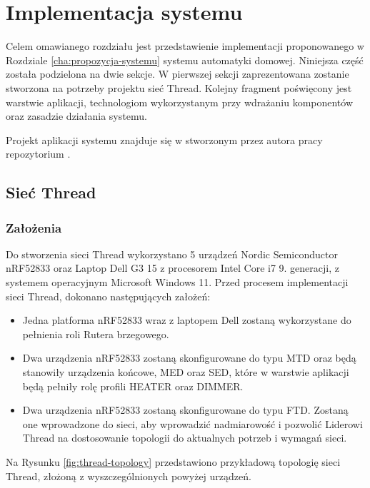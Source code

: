 \chapter{Implementacja systemu}
\label{cha:implementacja}

Celem omawianego rozdziału jest przedstawienie implementacji proponowanego w Rozdziale \ref{cha:propozycja-systemu} systemu automatyki domowej. Niniejsza część została podzielona na dwie sekcje. W pierwszej sekcji zaprezentowana zostanie stworzona na potrzeby projektu sieć Thread. Kolejny fragment poświęcony jest warstwie aplikacji, technologiom wykorzystanym przy wdrażaniu komponentów oraz zasadzie działania systemu.

Projekt aplikacji systemu znajduje się w stworzonym przez autora pracy repozytorium \cite{project-repo}.

\section{Sieć Thread}

    \subsection{Założenia}
    \label{sec:thread-network-assumptions}
    
        Do stworzenia sieci Thread wykorzystano 5 urządzeń Nordic Semiconductor nRF52833 oraz Laptop Dell G3 15 z procesorem Intel Core i7 9. generacji, z systemem operacyjnym Microsoft Windows 11. Przed procesem implementacji sieci Thread, dokonano następujących założeń:
        \begin{itemize}
            \item Jedna platforma nRF52833 wraz z laptopem Dell zostaną wykorzystane do pełnienia roli Rutera brzegowego.
            \item Dwa urządzenia nRF52833 zostaną skonfigurowane do typu MTD oraz będą stanowiły urządzenia końcowe, MED oraz SED, które w warstwie aplikacji będą pełniły rolę profili HEATER oraz DIMMER.
            \item Dwa urządzenia nRF52833 zostaną skonfigurowane do typu FTD. Zostaną one wprowadzone do sieci, aby wprowadzić nadmiarowość i pozwolić Liderowi Thread na dostosowanie topologii do aktualnych potrzeb i wymagań sieci.
        \end{itemize}

        Na Rysunku \ref{fig:thread-topology} przedstawiono przykładową topologię sieci Thread, złożoną z wyszczególnionych powyżej urządzeń.

